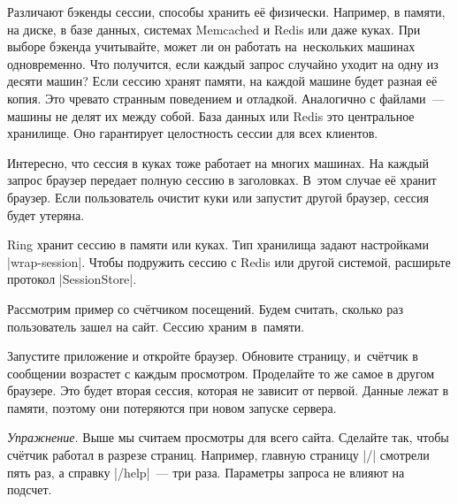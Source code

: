Различают бэкенды сессии, способы хранить е\"{е} физически. Например, в памяти, на
диске, в базе данных, системах Memcached и Redis или даже куках. При выборе
бэкенда учитывайте, может ли он работать на~нескольких машинах одновременно. Что
получится, если каждый запрос случайно уходит на одну из десяти машин? Если
сессию хранят памяти, на каждой машине будет разная е\"{е} копия. Это чревато
странным поведением и отладкой. Аналогично с файлами~--- машины не делят их
между собой. База данных или Redis это центральное хранилище. Оно гарантирует
целостность сессии для всех клиентов.

Интересно, что сессия в куках тоже работает на многих машинах. На каждый запрос
браузер передает полную сессию в заголовках. В~этом случае е\"{е} хранит
браузер. Если пользователь очистит куки или запустит другой браузер, сессия
будет утеряна.

Ring хранит сессию в памяти или куках. Тип хранилища задают настройками
\spverb|wrap-session|. Чтобы подружить сессию с Redis или другой системой,
расширьте протокол \spverb|SessionStore|.

Рассмотрим пример со сч\"{е}тчиком посещений. Будем считать, сколько раз
пользователь зашел на сайт. Сессию храним в~памяти.

\begin{english}
\end{english}

Запустите приложение и откройте браузер. Обновите страницу, и~сч\"{е}тчик в
сообщении возрастет с каждым просмотром. Проделайте то же самое в другом
браузере. Это будет вторая сессия, которая не зависит от первой. Данные лежат в
памяти, поэтому они потеряются при новом запуске сервера.

\emph{Упражнение.} Выше мы считаем просмотры для всего сайта. Сделайте так,
чтобы сч\"{е}тчик работал в разрезе страниц. Например, главную страницу \spverb|/|
смотрели пять раз, а справку \spverb|/help|~--- три раза. Параметры запроса не
влияют на подсчет.

